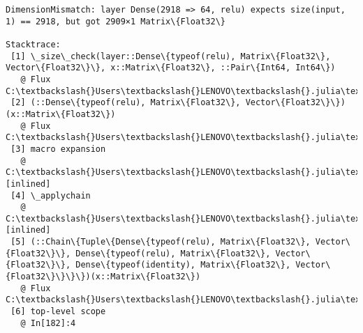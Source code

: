 \documentclass[11pt]{article}
\begin{document}
    \begin{Verbatim}[commandchars=\\\{\}, frame=single, framerule=2mm, rulecolor=\color{outerrorbackground}]
DimensionMismatch: layer Dense(2918 => 64, relu) expects size(input, 1) == 2918, but got 2909×1 Matrix\{Float32\}

Stacktrace:
 [1] \_size\_check(layer::Dense\{typeof(relu), Matrix\{Float32\}, Vector\{Float32\}\}, x::Matrix\{Float32\}, ::Pair\{Int64, Int64\})
   @ Flux C:\textbackslash{}Users\textbackslash{}LENOVO\textbackslash{}.julia\textbackslash{}packages\textbackslash{}Flux\textbackslash{}EHgZm\textbackslash{}src\textbackslash{}layers\textbackslash{}basic.jl:195
 [2] (::Dense\{typeof(relu), Matrix\{Float32\}, Vector\{Float32\}\})(x::Matrix\{Float32\})
   @ Flux C:\textbackslash{}Users\textbackslash{}LENOVO\textbackslash{}.julia\textbackslash{}packages\textbackslash{}Flux\textbackslash{}EHgZm\textbackslash{}src\textbackslash{}layers\textbackslash{}basic.jl:171
 [3] macro expansion
   @ C:\textbackslash{}Users\textbackslash{}LENOVO\textbackslash{}.julia\textbackslash{}packages\textbackslash{}Flux\textbackslash{}EHgZm\textbackslash{}src\textbackslash{}layers\textbackslash{}basic.jl:53 [inlined]
 [4] \_applychain
   @ C:\textbackslash{}Users\textbackslash{}LENOVO\textbackslash{}.julia\textbackslash{}packages\textbackslash{}Flux\textbackslash{}EHgZm\textbackslash{}src\textbackslash{}layers\textbackslash{}basic.jl:53 [inlined]
 [5] (::Chain\{Tuple\{Dense\{typeof(relu), Matrix\{Float32\}, Vector\{Float32\}\}, Dense\{typeof(relu), Matrix\{Float32\}, Vector\{Float32\}\}, Dense\{typeof(identity), Matrix\{Float32\}, Vector\{Float32\}\}\}\})(x::Matrix\{Float32\})
   @ Flux C:\textbackslash{}Users\textbackslash{}LENOVO\textbackslash{}.julia\textbackslash{}packages\textbackslash{}Flux\textbackslash{}EHgZm\textbackslash{}src\textbackslash{}layers\textbackslash{}basic.jl:51
 [6] top-level scope
   @ In[182]:4
    \end{Verbatim}


    
    
    
\end{document}
